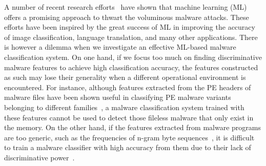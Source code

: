 A number of recent research efforts~\cite{NgramMalwareDetect, QgramMalwareDetect, McBoost, GraphMalwareDetect, YanDataset, AutoEncoderFeatureLearn, AutoEncoderMicrosoft, FunctionCallGraph, YuxinMalwareDnn,NovelFeatureFusion,StaticFeatures,PolySeqCls} have shown that machine learning (ML) offers a promising approach to thwart the voluminous malware attacks.
These efforts have been inspired by the great success of ML in improving the accuracy of image classification, language translation, and many other applications.
There is however a dilemma when we investigate an effective ML-based malware classification system.
On one hand, if we focus too much on finding discriminative malware features to achieve high classification accuracy, the features constructed as such may lose their generality when a different operational environment is encountered.
For instance, although features extracted from the PE headers of malware files have been shown useful in classifying PE malware variants belonging to different families~\cite{yan2013exploring},
a malware classification system trained with these features cannot be used to detect those fileless malware that only exist in the memory.
On the other hand, if the features extracted from malware programs are too generic, such as the frequencies of n-gram byte sequences~\cite{NgramMalwareDetect},
it is difficult to train a malware classifier with high accuracy from them due to their lack of discriminative power~\cite{yan2013exploring}.

